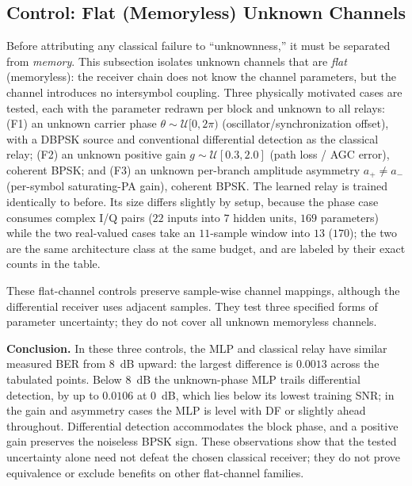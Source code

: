 \subsection{Control: Flat (Memoryless) Unknown Channels}\label{sec:flat-unknown-channels}

Before attributing any classical failure to ``unknownness,'' it must be separated from \emph{memory}. This subsection isolates unknown channels that are \emph{flat} (memoryless): the receiver chain does not know the channel parameters, but the channel introduces no intersymbol coupling. Three physically motivated cases are tested, each with the parameter redrawn per block and unknown to all relays: (F1) an unknown carrier phase $\theta\sim\mathcal{U}[0,2\pi)$ (oscillator/synchronization offset), with a DBPSK source and conventional differential detection as the classical relay; (F2) an unknown positive gain $g\sim\mathcal{U}[0.3,2.0]$ (path loss / AGC error), coherent BPSK; and (F3) an unknown per-branch amplitude asymmetry $a_+\!\neq\!a_-$ (per-symbol saturating-PA gain), coherent BPSK. The learned relay is trained identically to before. Its size differs slightly by setup, because the phase case consumes complex I/Q pairs ($22$ inputs into $7$ hidden units, $169$ parameters) while the two real-valued cases take an $11$-sample window into $13$ ($170$); the two are the same architecture class at the same budget, and are labeled by their exact counts in the table.

These flat-channel controls preserve sample-wise channel mappings, although the differential receiver uses adjacent samples. They test three specified forms of parameter uncertainty; they do not cover all unknown memoryless channels.

\textbf{Conclusion.} In these three controls, the MLP and classical relay have similar measured BER from 8~dB upward: the largest difference is $0.0013$ across the tabulated points. Below 8~dB the unknown-phase MLP trails differential detection, by up to $0.0106$ at 0~dB, which lies below its lowest training SNR; in the gain and asymmetry cases the MLP is level with DF or slightly ahead throughout. Differential detection accommodates the block phase, and a positive gain preserves the noiseless BPSK sign. These observations show that the tested uncertainty alone need not defeat the chosen classical receiver; they do not prove equivalence or exclude benefits on other flat-channel families.


